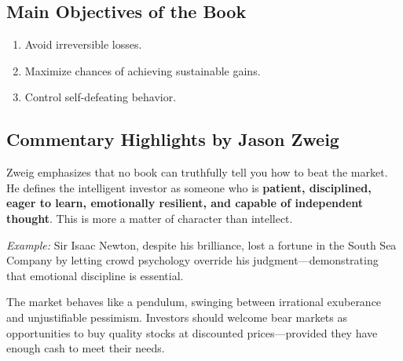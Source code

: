 \subsection*{Main Objectives of the Book}
\begin{enumerate}
    \item Avoid irreversible losses.
    \item Maximize chances of achieving sustainable gains.
    \item Control self-defeating behavior.
\end{enumerate}

\subsection*{Commentary Highlights by Jason Zweig}
Zweig emphasizes that no book can truthfully tell you how to beat the market. He defines the intelligent investor as someone who is \textbf{patient, disciplined, eager to learn, emotionally resilient, and capable of independent thought}. This is more a matter of character than intellect.

\textit{Example:} Sir Isaac Newton, despite his brilliance, lost a fortune in the South Sea Company by letting crowd psychology override his judgment—demonstrating that emotional discipline is essential.

The market behaves like a pendulum, swinging between irrational exuberance and unjustifiable pessimism. Investors should welcome bear markets as opportunities to buy quality stocks at discounted prices—provided they have enough cash to meet their needs.